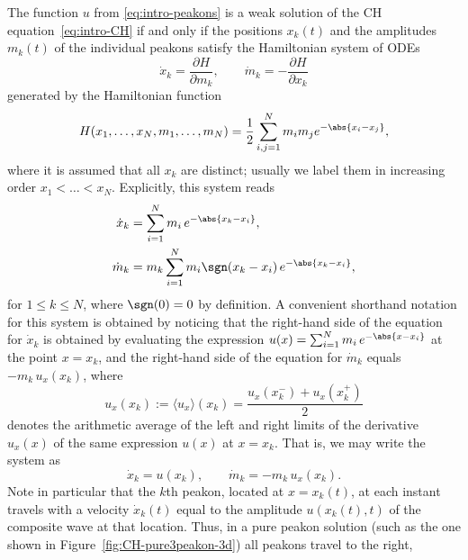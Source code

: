 \documentclass[10pt,a4paper]{article} \pdfoutput=1 
\begin{document}
The function $u$ from \eqref{eq:intro-peakons} is a weak solution
of the CH equation~\eqref{eq:intro-CH}
if and only if the positions $x_k(t)$ and the amplitudes $m_k(t)$ of the individual peakons
satisfy the Hamiltonian system of ODEs
\begin{equation}
  \label{eq:intro-CH-peakon-ode}
  \dot x_k = \frac{\partial H}{\partial m_k}
  ,\qquad
  \dot m_k = -\frac{\partial H}{\partial x_k}
\end{equation}
generated by the Hamiltonian function
\begin{equation}
  \label{eq:intro-CH-hamiltonian}
  H(x_1,\dots,x_N,m_1,\dots,m_N)
  = \frac12 \sum_{i,j=1}^N m_i m_j e^{-\abs{x_i-x_j}}
  ,
\end{equation}
where it is assumed that all $x_k$ are distinct;
usually we label them in increasing order $x_1 < \dots < x_N$.
Explicitly, this system reads
\begin{equation}
  \label{eq:intro-CH-peakon-ode-explicit}
  \begin{aligned}
    \dot x_k &= \sum_{i=1}^N m_i \, e^{-\abs{x_k-x_i}}
    ,\\
    \dot m_k &= m_k \sum_{i=1}^N m_i \sgn(x_k-x_i) \, e^{-\abs{x_k-x_i}}
    ,
  \end{aligned}
\end{equation}
for $1 \le k \le N$, where $\sgn(0)=0$ by definition.
A convenient shorthand notation for this system is obtained by noticing that the
right-hand side of the equation for $\dot x_k$ is obtained
by evaluating the expression $u(x) = \sum_{i=1}^N m_i \, e^{-\abs{x-x_i}}$
at the point $x=x_k$,
and the right-hand side of the equation for $\dot m_k$
equals $-m_k \, u_x(x_k)$, where
\begin{equation}
  u_x(x_k) := \langle u_x \rangle (x_k) = \frac{u_x(x_k^-) + u_x(x_k^+)}{2}
\end{equation}
denotes the arithmetic average of the left and right limits
of the derivative $u_x(x)$ of the same expression $u(x)$ at $x=x_k$.
That is, we may write the system as
\begin{equation}
  \label{eq:intro-CH-peakon-ode-shorthand}
  \dot x_k = u(x_k),
  \qquad
  \dot m_k = -m_k \, u_x(x_k)
  .
\end{equation}
Note in particular that the $k$th peakon,
located at $x = x_k(t)$,
at each instant travels with a velocity $\dot x_k(t)$ equal to
the amplitude $u(x_k(t),t)$ of the composite wave at that location.
Thus, in a pure peakon solution
(such as the one shown in Figure~\ref{fig:CH-pure3peakon-3d})
all peakons travel to the right,
\end{document}
